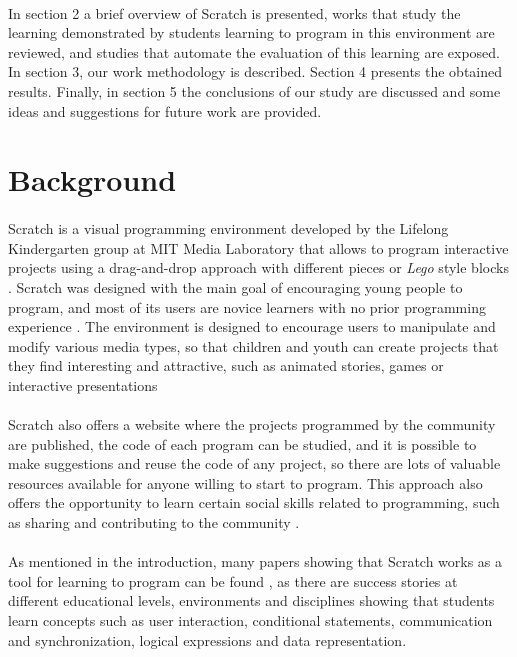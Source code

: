 \documentclass[a4paper,10pt]{article}
\begin{document}
\paragraph{}In section 2 a brief overview of Scratch is presented, works that study the learning demonstrated by students learning to program in this environment are reviewed, and studies that automate the evaluation of this learning are exposed. In section 3, our work methodology is described. Section 4 presents the obtained results. Finally, in section 5 the conclusions of our study are discussed and some ideas and suggestions for future work are provided.

\section{Background}

\paragraph{}Scratch is a visual programming environment developed by the Lifelong Kindergarten group at MIT Media Laboratory that allows to program interactive projects using a drag-and-drop approach with different pieces or \textit {Lego} style blocks \cite{resnick2009scratch}. Scratch was designed with the main goal of encouraging young people to program, and most of its users are novice learners with no prior programming experience \cite{maloney2010scratch}. The environment is designed to encourage users to manipulate and modify various media types, so that children and youth can create projects that they find interesting and attractive, such as animated stories, games or interactive presentations \cite{maloney2008programming}
\paragraph{}Scratch also offers a website where the projects programmed by the community are published, the code of each program can be studied, and it is possible to make suggestions and reuse the code of any project, so there are lots of valuable resources available for anyone willing to start to program. This approach also offers the opportunity to learn certain social skills related to programming, such as sharing and contributing to the community \cite{scaffidi2012skill}.
\paragraph{}As mentioned in the introduction, many papers showing that Scratch works as a tool for learning to program can be found \cite{maloney2008programming, franklin2013assessment, scaffidi2012skill, malan2007scratch}, as there are success stories at different educational levels, environments and disciplines showing that students learn concepts such as user interaction, conditional statements, communication and synchronization, logical expressions and data representation.
\end{document}

